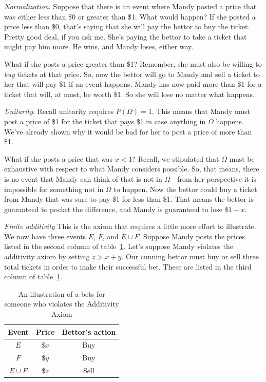 {\it Normalization}. Suppose that there is an event where Mandy posted a price that was either less than \$0 or greater than \$1.  What would happen?  If she posted a price less than \$0, that's saying that she will pay the bettor to buy the ticket.  Pretty good deal, if you ask me.  She's paying the bettor to take a ticket that might pay him more. He wins, and Mandy loses, either way. 

What if she posts a price greater than \$1?  Remember, she must also be willing to {\it buy} tickets at that price.  So, now the bettor will go to Mandy and sell a ticket to her that will pay \$1 if an event happens.  Mandy has now paid more than \$1 for a ticket that will, at most, be worth \$1. So she will lose no matter what happens. 

{\it Unitarity}.  Recall unitarity requires $P(\Omega) = 1$.  This means that Mandy must post a price of \$1 for the ticket that pays \$1 in case anything in $\Omega$ happens.  We've already shown why it would be bad for her to post a price of more than \$1.  

What if she posts a price that was $x<1$?  Recall, we stipulated that $\Omega$ must be exhaustive with respect to what Mandy considers possible.  So, that means, there is no event that Mandy can think of that is not in $\Omega$---from her perspective it is impossible for something not in $\Omega$ to happen.  Now the bettor could buy a ticket from Mandy that was sure to pay \$1 for less than \$1.  That means the bettor is guaranteed to pocket the difference, and Mandy is guaranteed to lose \$$1-x$.

{\it Finite additivity}  This is the axiom that requires a little more effort to illustrate.  We now have three events $E$, $F$, and $E \cup F$.  Suppose Mandy posts the prices listed in the second column of table~\ref{t:book-bets-additivity}. Let's suppose Mandy violates the additivity axiom by setting $z > x + y$. Our cunning bettor must buy or sell three total tickets in order to make their successful bet.  These are listed in the third column of table~\ref{t:book-bets-additivity}.

\begin{table}[h!]
\centering
\begin{tabular}{ccc}
\toprule
Event      & Price   & Bettor's action \\
\midrule
$E$        & \$$x$   & Buy \\
$F$        & \$$y$   & Buy \\
$E \cup F$ & \$$z$   & Sell \\
\bottomrule
\end{tabular}
\medskip
\caption{An illustration of a bets for someone who violates the Additivity Axiom}
\label{t:book-bets-additivity}
\end{table}

